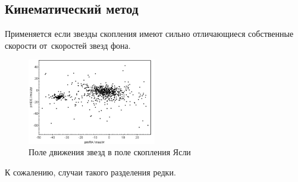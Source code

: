 \documentclass{beamer}
\begin{document}
    \subsection{Кинематический метод}
    \begin{frame}
        Применяется если звезды скопления имеют сильно отличающиеся собственные скорости от~скоростей звезд фона. 
        \begin{figure}
            \centering
            \includegraphics[width=0.5\textwidth]{pictures/Kin.jpg}
            \caption{Поле движения звезд в поле скопления Ясли}
        \end{figure}
        К сожалению, случаи такого разделения редки.
    \end{frame}
\end{document}
